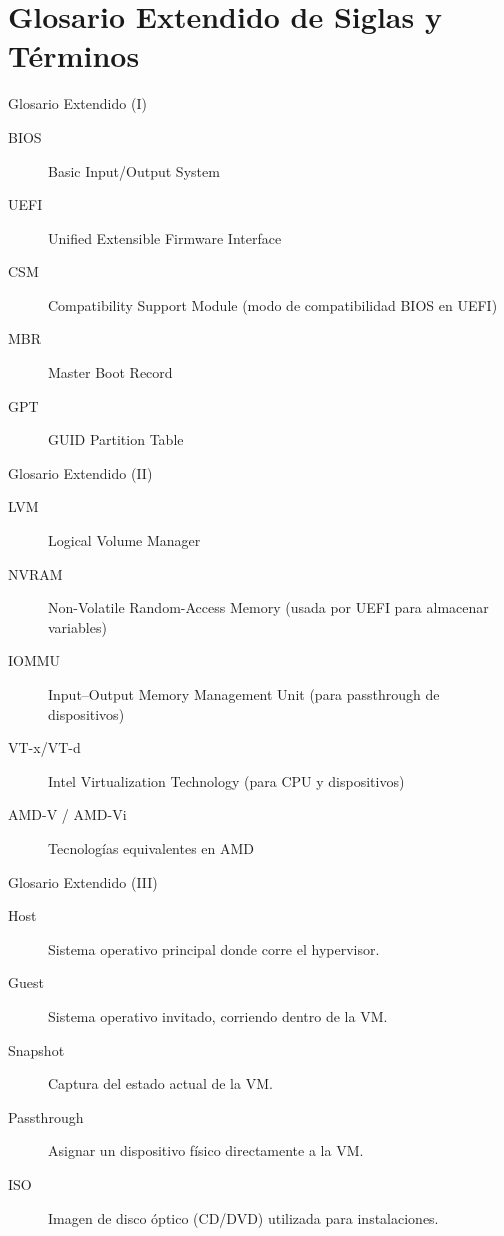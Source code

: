 \documentclass{beamer}
\begin{document}
\section{Glosario Extendido de Siglas y Términos}

\begin{frame}{Glosario Extendido (I)}
	\begin{description}
		\item[BIOS] Basic Input/Output System
		\item[UEFI] Unified Extensible Firmware Interface
		\item[CSM] Compatibility Support Module (modo de compatibilidad BIOS en UEFI)
		\item[MBR] Master Boot Record
		\item[GPT] GUID Partition Table
	\end{description}
\end{frame}

\begin{frame}{Glosario Extendido (II)}
	\begin{description}
		\item[LVM] Logical Volume Manager
		\item[NVRAM] Non-Volatile Random-Access Memory (usada por UEFI para almacenar variables)
		\item[IOMMU] Input–Output Memory Management Unit (para passthrough de dispositivos)
		\item[VT-x/VT-d] Intel Virtualization Technology (para CPU y dispositivos)
		\item[AMD-V / AMD-Vi] Tecnologías equivalentes en AMD
	\end{description}
\end{frame}

\begin{frame}{Glosario Extendido (III)}
	\begin{description}
		\item[Host] Sistema operativo principal donde corre el hypervisor.
		\item[Guest] Sistema operativo invitado, corriendo dentro de la VM.
		\item[Snapshot] Captura del estado actual de la VM.
		\item[Passthrough] Asignar un dispositivo físico directamente a la VM.
		\item[ISO] Imagen de disco óptico (CD/DVD) utilizada para instalaciones.
	\end{description}
\end{frame}
\end{document}
